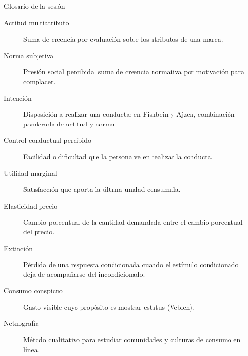 \documentclass[aspectratio=169,xcolor=dvipsnames]{beamer}
\begin{document}
\begin{frame}{Glosario de la sesión}
\tiny
\begin{description}
  \item[Actitud multiatributo] Suma de creencia por evaluación sobre los atributos de una marca.
  \item[Norma subjetiva] Presión social percibida: suma de creencia normativa por motivación para complacer.
  \item[Intención] Disposición a realizar una conducta; en Fishbein y Ajzen, combinación ponderada de actitud y norma.
  \item[Control conductual percibido] Facilidad o dificultad que la persona ve en realizar la conducta.
  \item[Utilidad marginal] Satisfacción que aporta la última unidad consumida.
  \item[Elasticidad precio] Cambio porcentual de la cantidad demandada entre el cambio porcentual del precio.
  \item[Extinción] Pérdida de una respuesta condicionada cuando el estímulo condicionado deja de acompañarse del incondicionado.
  \item[Consumo conspicuo] Gasto visible cuyo propósito es mostrar estatus (Veblen).
  \item[Netnografía] Método cualitativo para estudiar comunidades y culturas de consumo en línea.
\end{description}
\end{frame}
\end{document}
